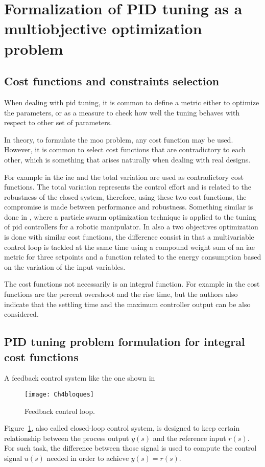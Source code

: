 %
\section{Formalization of PID tuning as a multiobjective optimization problem}
\label{sec:FormPIDMOOP}
\subsection{Cost functions and constraints selection}
\label{sec:CostFunSelec}
When dealing with \gls{pid} tuning, it is common to define a metric either to optimize the parameters, or as a measure to check how well the tuning behaves with respect to other set of parameters.

In theory, to formulate the \gls{moo} problem, any cost function may be used. However, it is common to select cost functions that are contradictory to each other, which is something that arises naturally when dealing with real designs.

For example in \cite{SabinaSanchez2017} the \gls{iae} and the total variation are used as contradictory cost functions. The total variation represents the control effort and is related to the robustness of the closed system, therefore, using these two cost functions, the compromise is made between performance and robustness. Something similar is done in \cite{Pierezan2014}, where a particle swarm optimization technique is applied to the tuning of \gls{pid} controllers for a robotic manipulator. In \cite{Zhou2018} also a two objectives optimization is done with similar cost functions, the difference consist in that a multivariable control loop is tackled at the same time using a compound weight sum of an \gls{iae} metric for three setpoints and a function related to the energy consumption based on the variation of the input variables.

The cost functions not necessarily is an integral function. For example in \cite{Abbas1995} the cost functions are the percent overshoot  and the rise time, but the authors also indicate that the settling time and the maximum controller output can be also considered.

\subsection{PID tuning problem formulation for integral cost functions}
\label{sec:CostProbPID}
A feedback control system like the one shown in %
\begin{figure}[tb]
	\centering
	\texttt{[image: Ch4bloques]}%
	\caption{Feedback control loop.}%
	\label{fig:bloques}%
\end{figure}
%
Figure~\ref{fig:bloques}, also called closed-loop control system, is designed to keep certain relationship between the process output $y(s)$ and the reference input $r(s)$. For such task, the difference between those signal is used to compute the control signal $u(s)$ needed in order to achieve $y(s)=r(s)$. 


